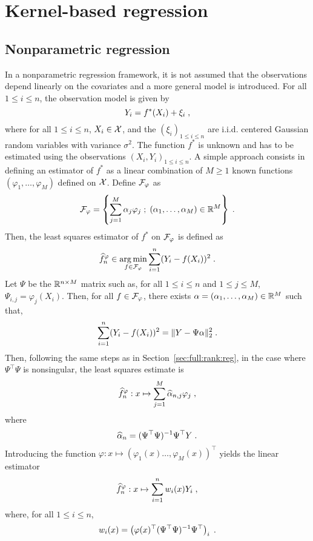 \chapter{Kernel-based regression}
\minitoc

\section{Nonparametric regression}
In a nonparametric regression framework, it is not assumed that the observations depend linearly on the covariates and a more general model is introduced. For all $1\leqslant i\leqslant n$, the observation model is given by
\[
Y_{i}=f^*(X_{i})+\xi_{i}\;,
\]
where for all $1\leqslant i\leqslant n$, $X_i\in\mathcal{X}$, and the $(\xi_{i})_{1\leqslant i \leqslant n}$ are i.i.d. centered Gaussian random variables with variance $\sigma^2$. The function $f^*$ is unknown and has to be estimated using the observations $(X_i,Y_i)_{1\leqslant i\leqslant n}$. A simple approach consists in defining an estimator of $f^*$ as a linear combination of $M\geqslant 1$ known functions $(\varphi_1,\ldots,\varphi_M)$ defined on $\mathcal{X}$. Define $\mathcal{F}_\varphi$ as
\[
\mathcal{F}_\varphi = \left\{\sum_{j=1}^M \alpha_j \varphi_j\;;\; (\alpha_1,\ldots,\alpha_M)\in\mathbb{R}^M\right\}\;.
\]
Then, the least squares estimator of $f^*$ on $\mathcal{F}_\varphi$ is defined as
\[
\widehat f^\varphi_n\in  \argmin_{f \in \calF_\varphi}  \sum_{i=1}^n(Y_i - f(X_i))^2\eqsp.
\]
Let $\Psi$ be the $\mathbb{R}^{n\times M}$ matrix such as, for all $1\leqslant i\leqslant n$ and $1\leqslant j\leqslant M$, $\Psi_{i,j} = \varphi_j(X_i)$. Then, for all $f \in \mathcal{F}_\varphi$, there exists $\alpha = (\alpha_1,\ldots,\alpha_M)\in\mathbb{R}^M$ such that,
\[
 \sum_{i=1}^n(Y_i - f(X_i))^2 = \|Y - \Psi \alpha\|_2^2\;.
\]
Then, following the same steps as in Section~\ref{sec:full:rank:reg}, in the case where $\Psi^\top \Psi$ is nonsingular, the least squares estimate is
\begin{equation}
\label{eq:def:nonparam:reg}
\widehat f^\varphi_n: x\mapsto \sum_{j=1}^M \widehat\alpha_{n,j} \varphi_j\;,
\end{equation}
where
\[
\widehat\alpha_{n} = (\Psi^\top \Psi)^{-1}\Psi^\top Y\;.
\]
Introducing the function $\varphi: x\mapsto (\varphi_1(x)\ldots,\varphi_M(x))^\top$ yields the linear estimator 
\[
\widehat f^\varphi_n: x \mapsto \sum_{i = 1}^n w_i(x)Y_i\;,
\]
where, for all $1\leqslant i\leqslant n$,
\[
w_i(x) = \left(\varphi(x)^\top(\Psi^\top\Psi)^{-1}\Psi^\top\right)_i\;.
\]


